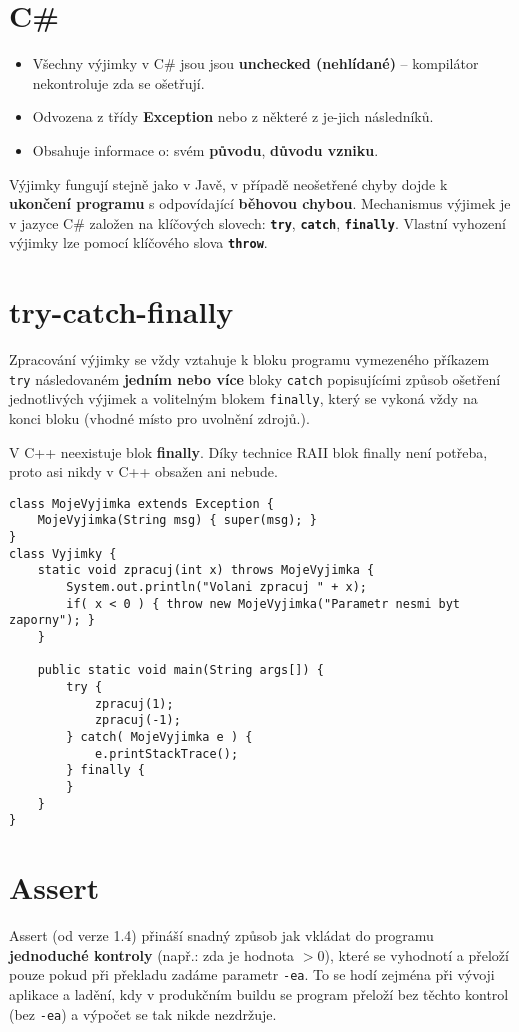\section{C\#}
\begin{itemize}
    \item Všechny výjimky v C\# jsou jsou \textbf{unchecked (nehlídané)} -- kompilátor nekontroluje zda se ošetřují.
    \item Odvozena z třídy \textbf{Exception} nebo z některé z je-jich následníků.
    \item Obsahuje informace o: svém \textbf{původu}, \textbf{důvodu vzniku}.
\end{itemize}
Výjimky fungují stejně jako v Javě, v případě neošetřené chyby dojde k \textbf{ukončení programu} s odpovídající \textbf{běhovou chybou}. Mechanismus výjimek je v jazyce C\# založen na klíčových slovech: \texttt{\textbf{try}}, \texttt{\textbf{catch}}, \texttt{\textbf{finally}}. Vlastní vyhození výjimky lze pomocí klíčového slova \textbf{\texttt{throw}}.

\section{try-catch-finally}
Zpracování výjimky se vždy vztahuje k bloku programu vymezeného příkazem \texttt{try} následovaném \textbf{jedním nebo více} bloky \texttt{catch} popisujícími způsob ošetření jednotlivých výjimek a volitelným blokem \texttt{finally}, který se vykoná vždy na konci bloku (vhodné místo pro uvolnění zdrojů.).

V C++ neexistuje blok \textbf{finally}. Díky technice RAII blok finally není potřeba, proto asi nikdy v C++ obsažen ani nebude.

\begin{verbatim}
class MojeVyjimka extends Exception { 
	MojeVyjimka(String msg) { super(msg); } 
}
class Vyjimky {
	static void zpracuj(int x) throws MojeVyjimka { 
		System.out.println("Volani zpracuj " + x); 
		if( x < 0 ) { throw new MojeVyjimka("Parametr nesmi byt zaporny"); }
	} 
	
	public static void main(String args[]) { 
		try { 
			zpracuj(1); 
			zpracuj(-1); 
		} catch( MojeVyjimka e ) {  
			e.printStackTrace();  
		} finally {
		}
	} 
}
\end{verbatim}

\section{Assert}
Assert (od verze 1.4) přináší snadný způsob jak vkládat do programu \textbf{jednoduché kontroly} (např.: zda je hodnota $> 0$), které se vyhodnotí a přeloží pouze pokud při překladu zadáme parametr \texttt{-ea}. To se hodí zejména při vývoji aplikace a ladění, kdy v produkčním buildu se program přeloží bez těchto kontrol (bez \texttt{-ea}) a výpočet se tak nikde nezdržuje.

